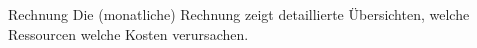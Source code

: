 \begin{flashcard}[Definition]{Rechnung}
    Die (monatliche) Rechnung zeigt detaillierte Übersichten, welche Ressourcen welche Kosten verursachen.
\end{flashcard}



